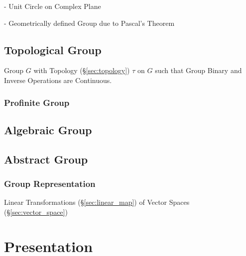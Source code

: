 - Unit Circle on Complex Plane

- Geometrically defined Group due to Pascal's Theorem
  \cite{lemmermeyer-shirali09}



\subsection{Topological Group}\label{sec:topological_group}

Group $G$ with Topology (\S\ref{sec:topology}) $\tau$ on $G$ such that
Group Binary and Inverse Operations are Continuous.



\subsubsection{Profinite Group}\label{sec:profinite_group}



\subsection{Algebraic Group}\label{sec:algebraic_group}

\subsection{Abstract Group}\label{sec:abstract_group}

\subsubsection{Group Representation}\label{sec:group_representation}

Linear Transformations (\S\ref{sec:linear_map}) of Vector Spaces
(\S\ref{sec:vector_space})



\section{Presentation}\label{sec:presentation}

